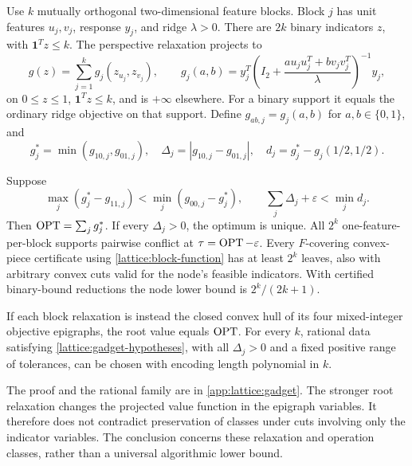 Use $k$ mutually orthogonal two-dimensional feature blocks. Block $j$ has
unit features $u_j,v_j$, response $y_j$, and ridge $\lambda>0$. There are
$2k$ binary indicators $z$, with $\mathbf1^Tz\le k$. The perspective
relaxation projects to
\begin{equation}
 g(z)=\sum_{j=1}^k g_j(z_{u_j},z_{v_j}),
 \qquad
 g_j(a,b)=y_j^T\left(I_2+
       \frac{a u_ju_j^T+b v_jv_j^T}{\lambda}\right)^{-1}y_j,
 \label{lattice:block-function}
\end{equation}
on $0\le z\le1$, $\mathbf1^Tz\le k$, and is $+\infty$ elsewhere.
For a binary support it equals the ordinary ridge objective on that
support. Define $g_{ab,j}=g_j(a,b)$ for $a,b\in\{0,1\}$, and
\begin{equation*}
 g_j^*=\min(g_{10,j},g_{01,j}),\quad
 \Delta_j=|g_{10,j}-g_{01,j}|,\quad
 d_j=g_j^*-g_j(1/2,1/2).
\end{equation*}

\begin{theorem}
\label{lattice:curvature-gadget}
Suppose
\begin{equation}
 \max_j(g_j^*-g_{11,j})
   <\min_j(g_{00,j}-g_j^*),
 \qquad \sum_j\Delta_j+\varepsilon<\min_j d_j.
 \label{lattice:gadget-hypotheses}
\end{equation}
Then $\operatorname{OPT}=\sum_jg_j^*$. If every $\Delta_j>0$, the optimum is unique.
All $2^k$ one-feature-per-block supports pairwise conflict at
$\tau=\operatorname{OPT}-\varepsilon$. Every $F$-covering convex-piece certificate
using \eqref{lattice:block-function} has at least $2^k$ leaves, also with
arbitrary convex cuts valid for the node's feasible indicators. With
certified binary-bound reductions the node lower bound is
$2^k/(2k+1)$.

If each block relaxation is instead the closed convex hull of its four
mixed-integer objective epigraphs, the root value equals $\operatorname{OPT}$. For every
$k$, rational data satisfying \eqref{lattice:gadget-hypotheses}, with all
$\Delta_j>0$ and a fixed positive range of tolerances, can be chosen with
encoding length polynomial in $k$.
\end{theorem}

The proof and the rational family are in \cref{app:lattice:gadget}.
The stronger root relaxation changes the projected value function in the
epigraph variables. It therefore does not contradict preservation of
classes under cuts involving only the indicator variables. The conclusion
concerns these relaxation and operation classes, rather than a universal
algorithmic lower bound.

